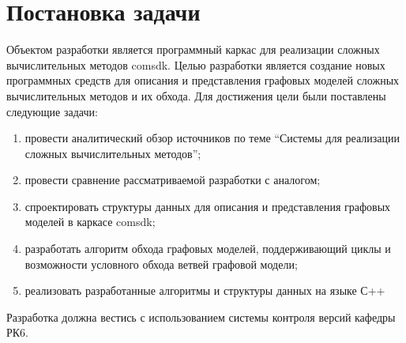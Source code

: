 \chapter{Постановка задачи}
Объектом разработки является программный каркас для реализации сложных вычислительных методов comsdk. Целью разработки является создание новых программных средств для описания и представления графовых моделей сложных вычислительных методов и их обхода. Для достижения цели были поставлены следующие задачи:
\begin{enumerate}
    \item провести аналитический обзор источников по теме ``Системы для реализации сложных вычислительных методов'';
    \item провести сравнение рассматриваемой разработки с аналогом;
    \item спроектировать структуры данных для описания и представления графовых моделей в каркасе comsdk;
    \item разработать алгоритм обхода графовых моделей, поддерживающий циклы и возможности условного обхода ветвей графовой модели;
    \item реализовать разработанные алгоритмы и структуры данных на языке С++
\end{enumerate}
Разработка должна вестись с использованием системы контроля версий кафедры РК6.


